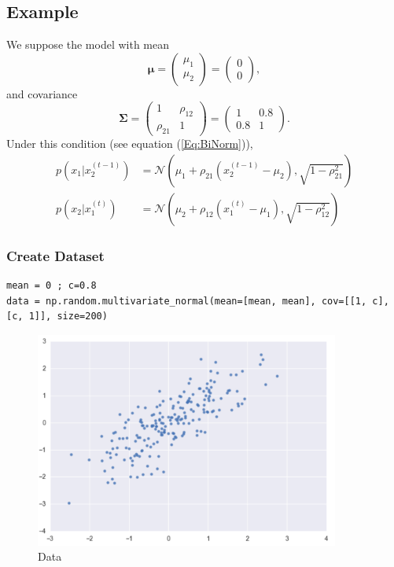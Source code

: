 \documentclass[a4paper,10.5pt,uplatex]{jsarticle}  %
\begin{document}
\subsection{Example}
We suppose the model with mean $$\boldsymbol{\mu} =  \begin{pmatrix} \mu_1 \\ \mu_2 \end{pmatrix}  = \begin{pmatrix} 0 \\ 0 \end{pmatrix}  ,$$ and covariance $$ \boldsymbol{\Sigma} = \begin{pmatrix} 1 & \rho_{12} \\ \rho_{21} & 1 \end{pmatrix} = \begin{pmatrix} 1 & 0.8 \\ 0.8 & 1 \end{pmatrix} .$$
  Under this condition (see equation (\ref{Eq:BiNorm})), 
\begin{align}
  p(x_1 | x_2^{(t-1)}) &= \mathcal{N} \left(\mu_1 + \rho_{21} (x_2^{(t-1)} - \mu_2), \sqrt{1 - \rho^2_{21}} \right)\\[9pt]
  p(x_2 | x_1^{(t)}) &= \mathcal{N} \left(\mu_2 + \rho_{12} (x_1^{(t)} - \mu_1), \sqrt{1 - \rho^2_{12}} \right)
\end{align}

\subsubsection{Create Dataset}
\begin{lstlisting}
mean = 0 ; c=0.8
data = np.random.multivariate_normal(mean=[mean, mean], cov=[[1, c], [c, 1]], size=200)
\end{lstlisting}
\begin{figure}[H]
\centering
\includegraphics[width=10.0cm]{Gibbs-data.pdf}
\caption{Data}
\end{figure}
\end{document}
